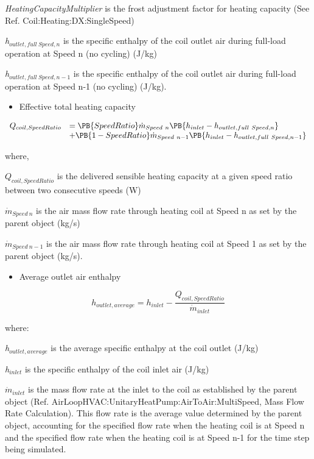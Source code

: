 \emph{HeatingCapacityMultiplier} is the frost adjustment factor for heating capacity (See Ref. Coil:Heating:DX:SingleSpeed)

\emph{h\(_{outlet,full~Speed,n}\)} is the specific enthalpy of the coil outlet air during full-load operation at Speed n (no cycling) (J/kg)

\emph{h\(_{outlet,full~Speed,n-1}\)} is the specific enthalpy of the coil outlet air during full-load operation at Speed n-1 (no cycling) (J/kg).

\begin{itemize}
  \item Effective total heating capacity
\end{itemize}

\begin{equation}
  \begin{array}{rl}
    Q_{coil,SpeedRatio} &= \PB{SpeedRatio} \dot{m}_{Speed~n} \PB{h_{inlet} - h_{outlet,full~Speed,n}} \\
                        &+ \PB{1 - SpeedRatio} \dot{m}_{Speed~n - 1} \PB{h_{inlet} - h_{outlet,full~Speed,n - 1}}
  \end{array}
\end{equation}

where,

\({{Q_{coil,SpeedRatio}}}\) is the delivered sensible heating capacity at a given speed ratio between two consecutive speeds (W)

\(\dot{m}_{Speed~n}\) is the air mass flow rate through heating coil at Speed n as set by the parent object (kg/s)

\(\dot{m}_{Speed~n-1}\) is the air mass flow rate through heating coil at Speed 1 as set by the parent object (kg/s).

\begin{itemize}
  \item Average outlet air enthalpy
\end{itemize}

\begin{equation}
  h_{outlet,average} = h_{inlet} - \frac{Q_{coil,SpeedRatio}}{\dot{m}_{inlet}}
\end{equation}

where:

\emph{h\(_{outlet,average}\)} is the average specific enthalpy at the coil outlet (J/kg)

\emph{h\(_{inlet}\)} is the specific enthalpy of the coil inlet air (J/kg)

\({\dot m_{inlet}}\) is the mass flow rate at the inlet to the coil as established by the parent object (Ref. AirLoopHVAC:UnitaryHeatPump:AirToAir:MultiSpeed, Mass Flow Rate Calculation). This flow rate is the average value determined by the parent object, accounting for the specified flow rate when the heating coil is at Speed n and the specified flow rate when the heating coil is at Speed n-1 for the time step being simulated.

